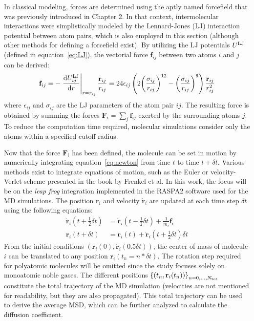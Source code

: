 \documentclass[main]{subfiles}
\begin{document}
In classical modeling, forces are determined using the aptly named forcefield that was previously introduced in Chapter 2.  In that context, intermolecular interactions were simplistically modeled by the Lennard-Jones (LJ) interaction potential between atom pairs, which is also employed in this section (although other methods for defining a forcefield exist). By utilizing the LJ potentials $U^{\text{LJ}}$ (defined in equation~\ref{eq:LJ}), the vectorial force $\mathbf{f}_{ij}$ between two atoms $i$ and $j$ can be derived:
\begin{equation}
  \mathbf{f}_{ij} = - \left.{\dfrac{\mathop{}\mathopen{}\mathrm{d} U^{\text{LJ}}_{ij}}{\mathop{}\mathopen{}\mathrm{d} r}}\right\rvert_{r=r_{ij}} \frac{\mathbf{r}_{ij}}{r_{ij}} = 24\epsilon_{ij}  \left(2{\left(\dfrac{\sigma_{ij}}{r_{ij}}\right)}^{12} - {\left(\dfrac{\sigma_{ij}}{r_{ij}}\right)}^{6}\right) \frac{\mathbf{r}_{ij}}{r_{ij}^2}
\end{equation}
where $\epsilon_{ij}$ and $\sigma_{ij}$ are the LJ parameters of the atom pair $ij$. The resulting force is obtained by summing the forces $\mathbf{F}_i=\sum_{j}\mathbf{f}_{ij}$ exerted by the surrounding atoms $j$. To reduce the computation time required, molecular simulations consider only the atoms within a specified cutoff radius.

Now that the force $\mathbf{F}_i$ has been defined, the molecule can be set in motion by numerically integrating equation~\ref{eq:newton} from time $t$ to time $t+\delta t$. Various methods exist to integrate equations of motion, such as the Euler or velocity-Verlet scheme presented in the book by Frenkel et al.\autocite{frenkel2001md} In this work, the focus will be on the \emph{leap frog} integration implemented in the RASPA2\autocite{dubbeldam2016} software used for the MD simulations. The position $\mathbf{r}_i$ and velocity $\dot{\mathbf{r}}_i$ are updated at each time step $\delta t$ using the following equations:
\begin{equation}\label{eq:frogleap_integration}
  \begin{split}
    \dot{\mathbf{r}}_i\left(t+\tfrac{1}{2}\delta t\right) & = \dot{\mathbf{r}}_i\left(t-\tfrac{1}{2}\delta t\right) + \tfrac{1}{m_i}\mathbf{f}_i \\
    \mathbf{r}_i\left(t+\delta t\right) & = \mathbf{r}_i\left(t\right) + \dot{\mathbf{r}}_i\left(t+\tfrac{1}{2}\delta t\right)\delta t
  \end{split}
\end{equation}
From the initial conditions $(\mathbf{r}_i(0),\dot{\mathbf{r}}_i(0.5\delta t))$, the center of mass of molecule $i$ can be translated to any position $\mathbf{r}_i(t_n=n*\delta t)$. The rotation step required for polyatomic molecules will be omitted since the study focuses solely on monoatomic noble gases. The different positions ${\left\{\left(t_n,\mathbf{r}_i(t_n)\right)\right\}}_{n=0,\ldots,N_{\text{tot}}}$ constitute the total trajectory of the MD simulation (velocities are not mentioned for readability, but they are also propagated). This total trajectory can be used to derive the average MSD, which can be further analyzed to calculate the diffusion coefficient.
\end{document}
